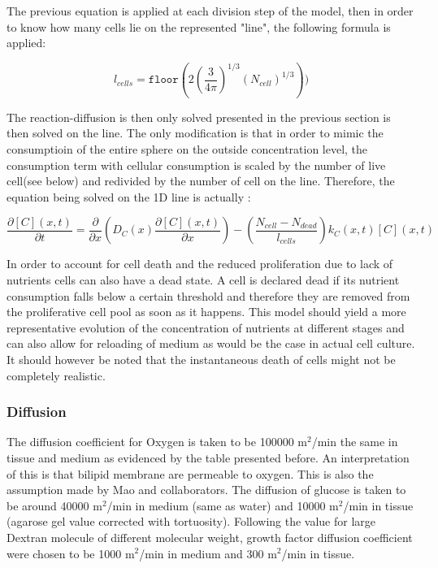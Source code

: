 \documentclass[11pt,a4paper]{article}
\begin{document}
The previous equation is applied at each division step of the model, then in order to know how many cells lie on the represented "line", the following formula is applied: 

\[l_{cells} = \mathtt{floor}(2(\frac{3}{4\pi})^{1/3}(N_{cell})^{1/3})) \] 
   
The reaction-diffusion is then only solved presented in the previous section is then solved on the line. The only modification is that in order to mimic the consumptioin of the entire sphere on the outside concentration level, the consumption term with cellular consumption is scaled by the number of live cell(see below) and redivided by the number of cell on the line. Therefore, the equation being solved on the 1D line is actually :

\[ \frac{\partial [C](x,t)}{\partial t} = \frac{\partial }{\partial x}(D_C(x)\frac{\partial [C](x,t)}{\partial x}) -(\frac{N_{cell} - N_{dead}}{l_{cells}})k_C(x,t)[C](x,t) \]  


In order to account for cell death and the reduced proliferation due to lack of nutrients cells can also have a dead state. A cell is declared dead if its nutrient consumption falls below a certain threshold and therefore they are removed from the proliferative cell pool as soon as it happens. This model should yield a more representative evolution of the concentration of nutrients at different stages and can also allow for reloading of medium as would be the case in actual cell culture. It should however be noted that the instantaneous death of cells might not be completely realistic. 

\subsubsection{Diffusion}
The diffusion coefficient for Oxygen is taken to be 100000 \textmu m$^2$/min the same in tissue and medium as evidenced by the table presented before. An interpretation of this is that bilipid membrane are permeable to oxygen. This is also the assumption made by Mao and collaborators.\cite{Mao2018} The diffusion of glucose is taken to be around 40000 \textmu m$^2$/min in medium (same as water) and 10000 \textmu m$^2$/min in tissue (agarose gel value corrected with tortuosity). Following the value for large Dextran molecule of different molecular weight, growth factor diffusion coefficient were chosen to be 1000 \textmu m$^2$/min in medium and 300  \textmu m$^2$/min in tissue.
\end{document}
